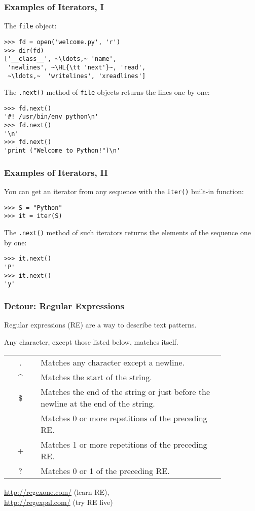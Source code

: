 \documentclass[english,serif,mathserif,xcolor=pdftex,dvipsnames,table]{beamer}
\begin{document}
\begin{frame}[fragile]
  \frametitle{Examples of Iterators, I}

  The \texttt{file} object:
\begin{lstlisting}
>>> fd = open('welcome.py', 'r')
>>> dir(fd)
['__class__', ~\ldots,~ 'name',
 'newlines', ~\HL{\tt 'next'}~, 'read',
 ~\ldots,~  'writelines', 'xreadlines']
\end{lstlisting}

  \+
  The \texttt{.next()} method of \texttt{file} objects returns the
  lines one by one:
\begin{lstlisting}
>>> fd.next()
'#! /usr/bin/env python\n'
>>> fd.next()
'\n'
>>> fd.next()
'print ("Welcome to Python!")\n'
\end{lstlisting}

\end{frame}


\begin{frame}[fragile]
  \frametitle{Examples of Iterators, II}

  You can get an iterator from any sequence with the \texttt{iter()} built-in function:
\begin{lstlisting}
>>> S = "Python"
>>> it = iter(S)
\end{lstlisting}

  \+
  The \texttt{.next()} method of such iterators returns the
  elements of the sequence one by one:
\begin{lstlisting}
>>> it.next()
'P'
>>> it.next()
'y'
\end{lstlisting}
\end{frame}

\begin{frame}[fragile]
  \frametitle{Detour: Regular Expressions}

  Regular expressions (RE) are a way to describe text
  patterns.

  \+
  Any character, except those listed below, matches itself.

  \+
  \begin{tabular}{>{\ttfamily}c>{\small}p{0.85\linewidth}}
    .  &    Matches any character except a newline. \\
    \textasciicircum  &    Matches the start of the string. \\
    \$ &    Matches the end of the string or just before the newline at the end of the string. \\
    *  &    Matches 0 or more repetitions of the preceding RE. \\
    +  &    Matches 1 or more repetitions of the preceding RE. \\
    ?  &    Matches 0 or 1 of the preceding RE. \\
  \end{tabular}

  \begin{seealso}
    \url{http://regexone.com/} (learn RE), \\
    \url{http://regexpal.com/} (try RE live)
  \end{seealso}
\end{frame}
\end{document}
